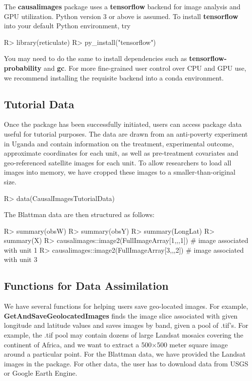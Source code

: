 \documentclass[nojss,shortnames]{jss} %
\begin{document}
The {\bf causalimages} package uses a {\bf tensorflow} backend for image analysis and GPU utilization. Python version 3 or above is assumed. To install {\bf tensorflow} into your default Python environment, try
\begin{CodeChunk}
\begin{CodeInput}
R> library(reticulate)
R> py_install("tensorflow")
\end{CodeInput}
\end{CodeChunk}
You may need to do the same to install dependencies such as {\bf tensorflow-probability} and {\bf gc}. For more fine-grained user control over CPU and GPU use, we recommend installing the requisite backend into a conda environment.

\subsection{Tutorial Data}
Once the package has been successfully initiated, users can access package data useful for tutorial purposes. The data are drawn from an anti-poverty experiment in Uganda \citet{blattman2020long} and contain information on the treatment, experimental outcome, approximate coordinates for each unit, as well as pre-treatment covariates and geo-referenced satellite images for each unit. To allow researchers to load all images into memory, we have cropped these images to a smaller-than-original size. 
\begin{CodeChunk}
\begin{CodeInput}
R> data(CausalImagesTutorialData)
\end{CodeInput}
\end{CodeChunk}
The Blattman data are then structured as follows: 
\begin{CodeChunk}
\begin{CodeInput}
R> summary(obsW)  %
R> summary(obsY)  %
R> summary(LongLat)  %
R> summary(X)  %
R> causalimages::image2(FullImageArray[1,,,1]) # image associated with unit 1
R> causalimages::image2(FullImageArray[3,,,2]) # image associated with unit 3
\end{CodeInput}
\end{CodeChunk}

\subsection{Functions for Data Assimilation}\label{s:DataAssim}
We have several functions for helping users save geo-located images. For example, {\bf GetAndSaveGeolocatedImages} finds the image slice associated with given longitude and latitude values and saves images by band, given a pool of .tif's. For example, the .tif pool may contain dozens of large Landsat mosaics covering the continent of Africa, and we want to extract a 500$\times$500 meter square image around a particular point.  For the Blattman data, we have provided the Landsat images in the package. For other data, the user has to download data from USGS or Google Earth Engine. 
\end{document}
